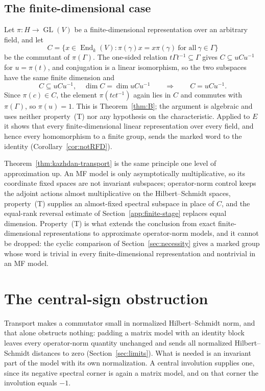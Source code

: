 \documentclass[11pt]{amsart}
\theoremstyle{definition}
\theoremstyle{remark}
\theoremstyle{plain}
\newcommand{\GL}{\operatorname{GL}}
\newcommand{\End}{\operatorname{End}}
\begin{document}
\subsection*{The finite-dimensional case}
Let $\pi\colon H\to\GL(V)$ be a finite-dimensional
representation over an arbitrary field, and let
\[
 C=\{x\in\End_k(V):\pi(\gamma)x=x\pi(\gamma)\ \text{for all}\
 \gamma\in\Gamma\}
\]
be the commutant of $\pi(\Gamma)$.  The one-sided relation
$t\Gamma t^{-1}\subseteq\Gamma$ gives $C\subseteq uCu^{-1}$ for
$u=\pi(t)$, and conjugation is a linear isomorphism, so the two
subspaces have the same finite dimension and
\[
 C\subseteq uCu^{-1},\quad \dim C=\dim uCu^{-1}
 \qquad\Longrightarrow\qquad C=uCu^{-1}.
\]
Since $\pi(c)\in C$, the element $\pi(tct^{-1})$ again lies in $C$ and
commutes with $\pi(\Gamma)$, so $\pi(u)=1$.  This is
Theorem~\ref{thm:B}; the argument is algebraic and uses neither
property~\textup{(T)} nor any hypothesis on the characteristic.
Applied to $E$ it shows that every finite-dimensional linear
representation over every field, and hence every homomorphism to a
finite group, sends the marked word to the identity
(Corollary~\ref{cor:notRFD}).

Theorem~\ref{thm:kazhdan-transport} is the same principle one level of
approximation up.  An MF model is only asymptotically multiplicative,
so its coordinate fixed spaces are not invariant subspaces;
operator-norm control keeps the adjoint actions almost multiplicative
on the Hilbert--Schmidt spaces, property~\textup{(T)} supplies an
almost-fixed spectral subspace in place of $C$, and the equal-rank
reversal estimate of Section~\ref{app:finite-stage} replaces equal
dimension.  Property~\textup{(T)} is what extends the conclusion from
exact finite-dimensional representations to approximate operator-norm
models, and it cannot be dropped: the cyclic comparison of
Section~\ref{sec:necessity} gives a marked group whose word is trivial
in every finite-dimensional representation and nontrivial in an MF
model.

\section{The central-sign obstruction}\label{sec:sign}

Transport makes a commutator small in normalized Hilbert--Schmidt
norm, and that alone obstructs nothing: padding a matrix model with an
identity block leaves every operator-norm quantity unchanged and sends
all normalized Hilbert--Schmidt distances to zero
(Section~\ref{sec:limits}).  What is needed is an invariant part of
the model with its own normalization.  A central involution supplies
one, since its negative spectral corner is again a matrix model, and
on that corner the involution equals $-1$.
\end{document}
